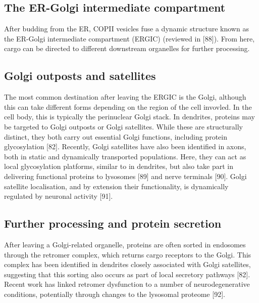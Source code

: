 \documentclass[
  12pt,
  a4paper,
]{book}
\begin{document}
\hypertarget{the-er-golgi-intermediate-compartment}{%
\subsection{The ER-Golgi intermediate compartment}\label{the-er-golgi-intermediate-compartment}}

After budding from the ER, COPII vesicles fuse a dynamic structure known as the ER-Golgi intermediate compartment (ERGIC) (reviewed in {[}88{]}). From here, cargo can be directed to different downstream organelles for further processing.

\hypertarget{golgi-outposts-and-satellites}{%
\subsection{Golgi outposts and satellites}\label{golgi-outposts-and-satellites}}

The most common destination after leaving the ERGIC is the Golgi, although this can take different forms depending on the region of the cell invovled. In the cell body, this is typically the perinuclear Golgi stack. In dendrites, proteins may be targeted to Golgi outposts or Golgi satellites. While these are structurally distinct, they both carry out essential Golgi functions, including protein glycosylation {[}82{]}. Recently, Golgi satellites have also been identified in axons, both in static and dynamically transported populations. Here, they can act as local glycosylation platforms, similar to in dendrites, but also take part in delivering functional proteins to lysosomes {[}89{]} and nerve terminals {[}90{]}. Golgi satellite localisation, and by extension their functionality, is dynamically regulated by neuronal activity {[}91{]}.

\hypertarget{further-processing-and-protein-secretion}{%
\subsection{Further processing and protein secretion}\label{further-processing-and-protein-secretion}}

After leaving a Golgi-related organelle, proteins are often sorted in endosomes through the retromer complex, which returns cargo receptors to the Golgi. This complex has been identified in dendrites closely associated with Golgi satellites, suggesting that this sorting also occurs as part of local secretory pathways {[}82{]}. Recent work has linked retromer dysfunction to a number of neurodegenerative conditions, potentially through changes to the lysosomal proteome {[}92{]}.
\end{document}
